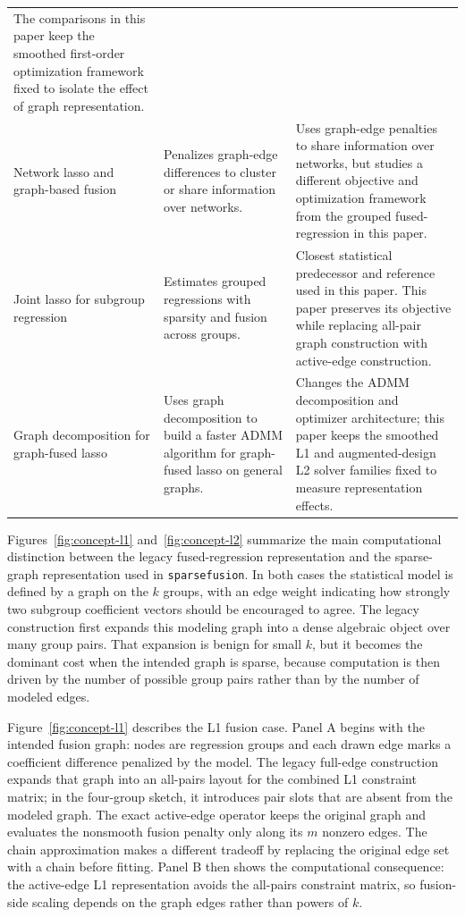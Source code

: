 \documentclass[twoside,11pt]{article}
\newcommand{\sparsefusion}{\texttt{sparsefusion}\xspace}
\begin{document}
\begin{table}[t]
{\begin{tabular}{@{}>{\raggedright\arraybackslash}p{}
>{\raggedright\arraybackslash}p{}
>{\raggedright\arraybackslash}p{}@{}}
The comparisons in this paper keep the smoothed first-order optimization framework fixed to isolate the effect of graph representation. \\
Network lasso and graph-based fusion \citep{hallac2015network} &
Penalizes graph-edge differences to cluster or share information over networks. &
Uses graph-edge penalties to share information over networks, but studies a different objective and optimization framework from the grouped fused-regression in this paper. \\
Joint lasso for subgroup regression \citep{dondelinger2020joint} &
Estimates grouped regressions with sparsity and fusion across groups. &
Closest statistical predecessor and reference used in this paper. This paper preserves its objective while replacing all-pair graph construction with active-edge construction. \\
Graph decomposition for graph-fused lasso \citep{yu2025graphdecomp} &
Uses graph decomposition to build a faster ADMM algorithm for graph-fused lasso on general graphs. &
Changes the ADMM decomposition and optimizer architecture; this paper keeps the smoothed L1 and augmented-design L2 solver families fixed to measure representation effects. \\
\bottomrule
\end{tabular}
}
\end{table}

Figures~\ref{fig:concept-l1} and~\ref{fig:concept-l2} summarize the main
computational distinction between the legacy fused-regression representation
and the sparse-graph representation used in \sparsefusion. In both cases the
statistical model is defined by a graph on the $k$ groups, with an edge
weight indicating how strongly two subgroup coefficient vectors should be
encouraged to agree. The legacy construction first expands this modeling graph
into a dense algebraic object over many group pairs. That expansion is benign
for small $k$, but it becomes the dominant cost when the intended graph is
sparse, because computation is then driven by the number of possible group
pairs rather than by the number of modeled edges.

Figure~\ref{fig:concept-l1} describes the L1 fusion case. Panel A begins with
the intended fusion graph: nodes are regression groups and each drawn edge
marks a coefficient difference penalized by the model. The legacy full-edge
construction expands that graph into an all-pairs layout for the combined L1
constraint matrix; in the four-group sketch, it introduces pair slots that
are absent from the modeled graph. The exact active-edge operator keeps the
original graph and evaluates the nonsmooth fusion penalty only along its $m$
nonzero edges. The chain approximation makes a different tradeoff by replacing
the original edge set with a chain before fitting. Panel B then shows the
computational consequence: the active-edge L1 representation avoids the
all-pairs constraint matrix, so fusion-side scaling depends on the graph edges
rather than powers of $k$.
\end{document}
